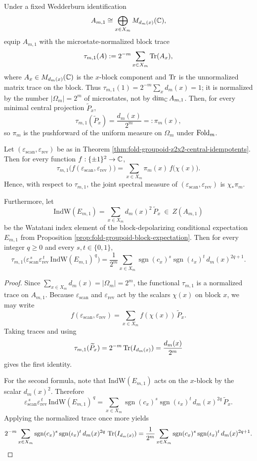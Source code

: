 \begin{theorem}\label{thm:fold-groupoid-z2x2-joint-spectral-measure}
Under a fixed Wedderburn identification
\[
A_{m,1}\cong\bigoplus_{x\in X_m}M_{d_m(x)}(\mathbb{C}),
\]
equip \(A_{m,1}\) with the microstate-normalized block trace
\[
\tau_{m,1}(A):=2^{-m}\sum_{x\in X_m}\operatorname{Tr}(A_x),
\]
where \(A_x\in M_{d_m(x)}(\mathbb{C})\) is the \(x\)-block component and \(\operatorname{Tr}\) is the unnormalized matrix trace on the block.
Thus \(\tau_{m,1}(1)=2^{-m}\sum_x d_m(x)=1\); it is normalized by the number \(|\Omega_m|=2^m\) of microstates, not by \(\dim_{\mathbb{C}} A_{m,1}\).
Then, for every minimal central projection \(\widetilde P_x\),
\[
\tau_{m,1}(\widetilde P_x)=\frac{d_m(x)}{2^m}=: \pi_m(x),
\]
so \(\pi_m\) is the pushforward of the uniform measure on \(\Omega_m\) under \(\operatorname{Fold}_m\).

Let \((\varepsilon_{\mathrm{scan}},\varepsilon_{\mathrm{rev}})\) be as in Theorem \ref{thm:fold-groupoid-z2x2-central-idempotents}. Then for every function \(f:\{\pm1\}^2\to\mathbb{C}\),
\[
\tau_{m,1}\!\bigl(f(\varepsilon_{\mathrm{scan}},\varepsilon_{\mathrm{rev}})\bigr)
=\sum_{x\in X_m}\pi_m(x)\,f\!\bigl(\chi(x)\bigr).
\]
Hence, with respect to \(\tau_{m,1}\), the joint spectral measure of \((\varepsilon_{\mathrm{scan}},\varepsilon_{\mathrm{rev}})\) is \(\chi_\ast\pi_m\).

Furthermore, let
\[
\mathrm{IndW}(E_{m,1})=\sum_{x\in X_m} d_m(x)^2\,\widetilde P_x\ \in\ Z(A_{m,1})
\]
be the Watatani index element of the block-depolarizing conditional expectation \(E_{m,1}\) from Proposition \ref{prop:fold-groupoid-block-expectation}.
Then for every integer \(q\ge 0\) and every \(s,t\in\{0,1\}\),
\[
\tau_{m,1}\!\bigl(\varepsilon_{\mathrm{scan}}^{\,s}\varepsilon_{\mathrm{rev}}^{\,t}\,\mathrm{IndW}(E_{m,1})^{\,q}\bigr)
=
\frac{1}{2^m}\sum_{x\in X_m}\operatorname{sgn}(c_x)^{s}\operatorname{sgn}(\iota_x)^{t}\,d_m(x)^{2q+1}.
\]
\end{theorem}

\begin{proof}
Since \(\sum_{x\in X_m}d_m(x)=|\Omega_m|=2^m\), the functional \(\tau_{m,1}\) is a normalized trace on \(A_{m,1}\). Because \(\varepsilon_{\mathrm{scan}}\) and \(\varepsilon_{\mathrm{rev}}\) act by the scalars \(\chi(x)\) on block \(x\), we may write
\[
f(\varepsilon_{\mathrm{scan}},\varepsilon_{\mathrm{rev}})
=\sum_{x\in X_m} f(\chi(x))\,\widetilde P_x.
\]
Taking traces and using
\[
\tau_{m,1}(\widetilde P_x)=2^{-m}\operatorname{Tr}(I_{d_m(x)})=\frac{d_m(x)}{2^m}
\]
gives the first identity.

For the second formula, note that \(\mathrm{IndW}(E_{m,1})\) acts on the \(x\)-block by the scalar \(d_m(x)^2\). Therefore
\[
\varepsilon_{\mathrm{scan}}^{\,s}\varepsilon_{\mathrm{rev}}^{\,t}\,\mathrm{IndW}(E_{m,1})^{\,q}
=\sum_{x\in X_m}\operatorname{sgn}(c_x)^s\operatorname{sgn}(\iota_x)^t\,d_m(x)^{2q}\,\widetilde P_x.
\]
Applying the normalized trace once more yields
\[
2^{-m}\sum_{x\in X_m}\operatorname{sgn}(c_x)^s\operatorname{sgn}(\iota_x)^t\,d_m(x)^{2q}\,\operatorname{Tr}(I_{d_m(x)})
=\frac{1}{2^m}\sum_{x\in X_m}\operatorname{sgn}(c_x)^s\operatorname{sgn}(\iota_x)^t\,d_m(x)^{2q+1}.
\]
\end{proof}

